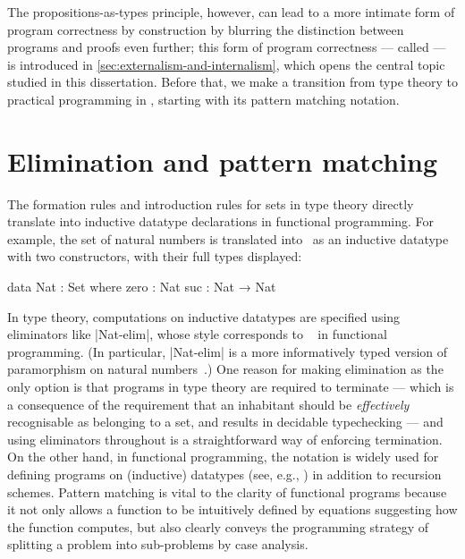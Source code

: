 The propositions-as-types principle, however, can lead to a more intimate form of program correctness by construction by blurring the distinction between programs and proofs even further; this form of program correctness --- called  --- is introduced in \autoref{sec:externalism-and-internalism}, which opens the central topic studied in this dissertation.
Before that, we make a transition from type theory to practical programming in \Agda, starting with its pattern matching notation.

\section{Elimination and pattern matching}
\label{sec:pattern-matching}

The formation rules and introduction rules for sets in type theory directly translate into inductive datatype declarations in functional programming.
For example, the set of natural numbers is translated into \Agda\ as an inductive datatype with two constructors, with their full types displayed:
\begin{code}
data Nat : Set where
  zero  : Nat
  suc   : Nat → Nat
\end{code}
In type theory, computations on inductive datatypes are specified using eliminators like |Nat-elim|, whose style corresponds to ~\citep{Meijer-bananas} in functional programming.
(In particular, |Nat-elim| is a more informatively typed version of paramorphism on natural numbers~\citep{Meertens-paramorphisms}.)
One reason for making elimination as the only option is that programs in type theory are required to terminate --- which is a consequence of the requirement that an inhabitant should be \emph{effectively} recognisable as belonging to a set, and results in decidable typechecking --- and using eliminators throughout is a straightforward way of enforcing termination.
On the other hand, in functional programming, the  notation is widely used for defining programs on (inductive) datatypes (see, e.g., \citet[Section~5]{Hudak-history-of-Haskell}) in addition to recursion schemes.
Pattern matching is vital to the clarity of functional programs because it not only allows a function to be intuitively defined by equations suggesting how the function computes, but also clearly conveys the programming strategy of splitting a problem into sub-problems by case analysis.

